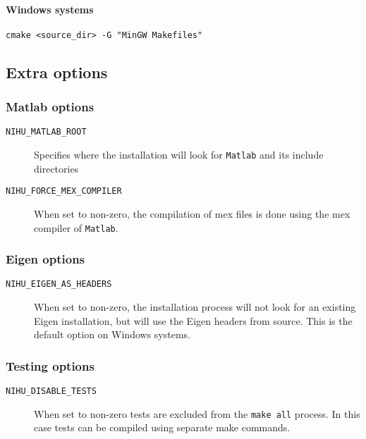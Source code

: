 \documentclass[a4paper,10pt]{article}
\begin{document}
\paragraph{Windows systems}

\begin{verbatim}
cmake <source_dir> -G "MinGW Makefiles"
\end{verbatim}


\subsection{Extra options}

\subsubsection{Matlab options}

\begin{description}
	\item [\texttt{NIHU\_MATLAB\_ROOT}] Specifies where the installation will look for \texttt{Matlab} and its include directories
	\item [\texttt{NIHU\_FORCE\_MEX\_COMPILER}] When set to non-zero, the compilation of mex files is done using the mex compiler of \texttt{Matlab}.
\end{description}

\subsubsection{Eigen options}

\begin{description}
	\item [\texttt{NIHU\_EIGEN\_AS\_HEADERS}] When set to non-zero, the installation process will not look for an existing Eigen installation, but will use the Eigen headers from source. This is the default option on Windows systems.
\end{description}

\subsubsection{Testing options}

\begin{description}
	\item [\texttt{NIHU\_DISABLE\_TESTS}] When set to non-zero tests are excluded from the \texttt{make all} process. In this case tests can be compiled using separate make commands.
\end{description}
\end{document}
